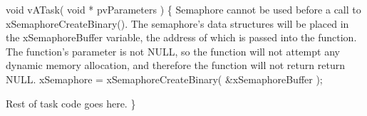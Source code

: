 \begin{DoxyPre} void vATask( void * pvParameters )
 \{
Semaphore cannot be used before a call to xSemaphoreCreateBinary().
The semaphore's data structures will be placed in the xSemaphoreBuffer
variable, the address of which is passed into the function.  The
function's parameter is not NULL, so the function will not attempt any
dynamic memory allocation, and therefore the function will not return
return NULL.
    xSemaphore = xSemaphoreCreateBinary( &xSemaphoreBuffer );\end{DoxyPre}



\begin{DoxyPre}Rest of task code goes here.
 \}
 \end{DoxyPre}
 